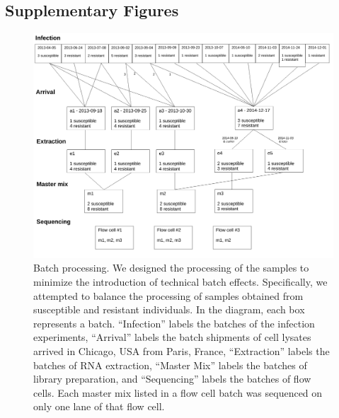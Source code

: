 \documentclass[fleqn,10pt]{wlscirep}
\begin{document}
\subsection*{Supplementary Figures}


\begin{figure}[ht]
\centering
\includegraphics[width=\linewidth]{../figure/processing.pdf}
\caption{
Batch processing. We designed the processing of the samples to
minimize the introduction of technical batch effects. Specifically, we
attempted to balance the processing of samples obtained from
susceptible and resistant individuals. In the diagram, each box
represents a batch. “Infection” labels the batches of the infection
experiments, “Arrival” labels the batch shipments of cell lysates
arrived in Chicago, USA from Paris, France, “Extraction” labels the
batches of RNA extraction, “Master Mix” labels the batches of library
preparation, and “Sequencing” labels the batches of flow cells. Each
master mix listed in a flow cell batch was sequenced on only one lane
of that flow cell.
}
\label{fig:process}
\end{figure}
\end{document}
